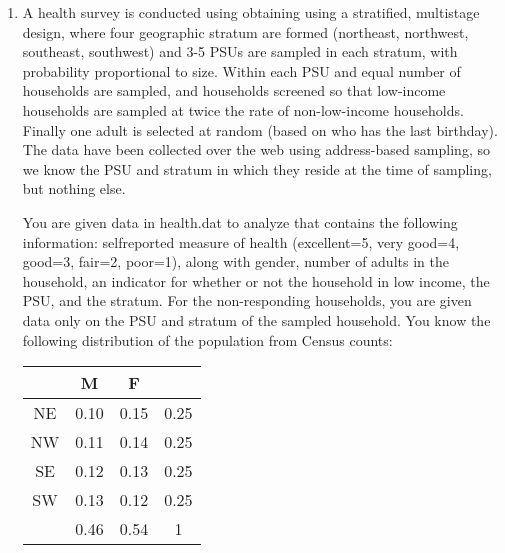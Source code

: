 \documentclass[12pt]{article}
\begin{document}
\begin{enumerate}
\begin{enumerate}[itemsep=5ex]
\item Compute the mean height and associated standard error using the complete case data {\bf [5 pt]}

\item Compute the mean height and associated standard error using a single imputation hot desk {\bf [5 pt]}

\item Compute the mean height and associated standard error using multiple imputation with 20 imputed datasets. You may do this “by hand” following the algorithm from class, or use on of the software packages for MI. Explain your choice of imputation model. {\bf [15 pt]}

\end{enumerate}

\item A health survey is conducted using obtaining using a stratified, multistage design, where four geographic stratum are formed (northeast, northwest, southeast, southwest) and 3-5 PSUs are sampled in each stratum, with probability proportional to size. Within each PSU and equal number of households are sampled, and households screened so that low-income households are sampled at twice the rate of non-low-income households. Finally one adult is selected at random (based on who has the last birthday). The data have been collected over the web using address-based sampling, so we know the PSU and stratum in which they reside at the time of sampling, but nothing else.
\vspace{0.5cm}

You are given data in health.dat to analyze that contains the following information: selfreported measure of health (excellent=5, very good=4, good=3, fair=2, poor=1), along with gender, number of adults in the household, an indicator for whether or not the household in low income, the PSU, and the stratum. For the non-responding households, you are given data only on the PSU and stratum of the sampled household. You know the following distribution of the population from Census counts:

\begin{table}[!th]
\centering
\begin{tabular}{c c c | c}
& M & F & \\ \hline
NE & 0.10 & 0.15 & 0.25 \\
NW & 0.11 & 0.14 & 0.25 \\
SE & 0.12 & 0.13 & 0.25 \\
SW & 0.13 & 0.12 & 0.25 \\ \hline
& 0.46 & 0.54 & 1 \\ \hline
\end{tabular}
\end{table}


\end{enumerate}
\end{document}
